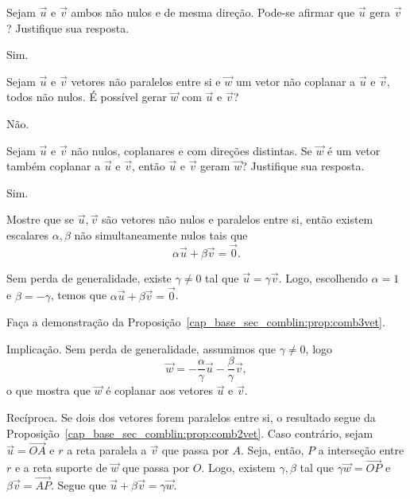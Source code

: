 \begin{exer}
  Sejam $\vec{u}$ e $\vec{v}$ ambos não nulos e de mesma direção. Pode-se afirmar que $\vec{u}$ gera $\vec{v}$? Justifique sua resposta.
\end{exer}
\begin{resp}
  Sim.
\end{resp}

\begin{exer}
  Sejam $\vec{u}$ e $\vec{v}$ vetores não paralelos entre si e $\vec{w}$ um vetor não coplanar a $\vec{u}$ e $\vec{v}$, todos não nulos. É possível gerar $\vec{w}$ com $\vec{u}$ e $\vec{v}$?
\end{exer}
\begin{resp}
  Não.
\end{resp}

\begin{exer}
  Sejam $\vec{u}$ e $\vec{v}$ não nulos, coplanares e com direções distintas. Se $\vec{w}$ é um vetor também coplanar a $\vec{u}$ e $\vec{v}$, então $\vec{u}$ e $\vec{v}$ geram $\vec{w}$? Justifique sua resposta.
\end{exer}
\begin{resp}
  Sim.
\end{resp}

\begin{exer}\label{cap_base_sec_comblin:exer:parallel_comblin_ntrivial}
  Mostre que se $\vec{u},\vec{v}$ são vetores não nulos e paralelos entre si, então existem escalares $\alpha,\beta$ não simultaneamente nulos tais que
  \begin{equation}
    \alpha\vec{u} + \beta\vec{v} = \vec{0}.
  \end{equation}
\end{exer}
\begin{resp}
  Sem perda de generalidade, existe $\gamma\neq 0$ tal que $\vec{u} = \gamma\vec{v}$. Logo, escolhendo $\alpha = 1$ e $\beta = -\gamma$, temos que $\alpha\vec{u} + \beta\vec{v} = \vec{0}$.
\end{resp}

\begin{exer}\label{cap_base_sec_comblin:exer:comb3vet}
  Faça a demonstração da Proposição~\ref{cap_base_sec_comblin:prop:comb3vet}.
\end{exer}
\begin{resp}
  Implicação. Sem perda de generalidade, assumimos que $\gamma \neq 0$, logo
  \begin{equation}
    \vec{w} = -\frac{\alpha}{\gamma}\vec{u} - \frac{\beta}{\gamma}\vec{v},  
  \end{equation}
  o que mostra que $\vec{w}$ é coplanar aos vetores $\vec{u}$ e $\vec{v}$.

  Recíproca. Se dois dos vetores forem paralelos entre si, o resultado segue da Proposição~\ref{cap_base_sec_comblin:prop:comb2vet}. Caso contrário, sejam $\vec{u} = \overrightarrow{OA}$ e $r$ a reta paralela a $\vec{v}$ que passa por $A$. Seja, então, $P$ a interseção entre $r$ e a reta suporte de $\vec{w}$ que passa por $O$. Logo, existem $\gamma,\beta$ tal que $\gamma\vec{w} = \overrightarrow{OP}$ e $\beta\vec{v} = \overrightarrow{AP}$. Segue que $\vec{u}+\beta\vec{v} = \gamma\vec{w}$.
\end{resp}

